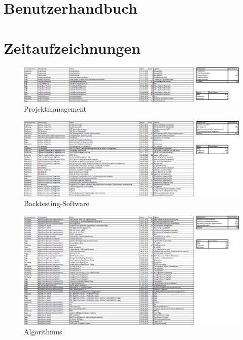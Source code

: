 \chapter{Benutzerhandbuch\label{appendix_A}}







\chapter{Zeitaufzeichnungen}

\begin{figure}
	\centering
		\includegraphics[width=1\textheight, angle=90]{graphics/appendix/projektmanagement.PNG}
	\caption{Projektmanagement}
\end{figure}

\begin{figure}
	\centering
		\includegraphics[width=1.0\textheight, angle=90]{graphics/appendix/backtestingsoftware.PNG}
	\caption{Backtesting-Software}
\end{figure}

\begin{figure}
	\centering
		\includegraphics[width=1.0\textheight, angle=90]{graphics/appendix/algorithmus.PNG}
	\caption{Algorithmus}
\end{figure}

